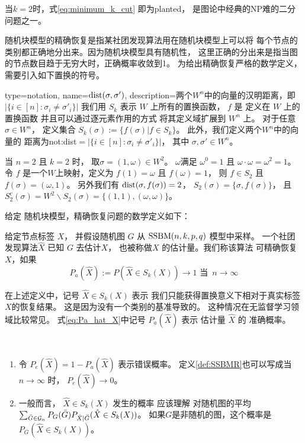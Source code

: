 当$k=2$时，式\eqref{eq:minimum_k_cut} 即为\gls{planted}，
是图论中经典的NP难的二分问题之一。


随机块模型的精确恢复是指某社团发现算法用在随机块模型上可以将
每个节点的类别都正确地分出来。因为随机块模型具有随机性，
这里正确的分出来是指当图的节点数目趋于无穷大时，正确概率收敛到1。
为给出精确恢复严格的数学定义，需要引入如下置换的符号。

{
  type=notation,
  name={$\operatorname{dist}(\sigma, \sigma')$},
  description={两个$W^n$中的向量的汉明距离，即$|\{i\in[n]:\sigma_i\neq \sigma'_i\}|$}
}
我们用 $S_k$ 表示 $W$  上所有的置换函数， 
$f$ 是 定义在 $W$ 上的置换函数
并且可以通过逐元素作用的方式
将其定义域扩展到 $W^n$ 上。
对于任意 $\sigma \in W^n$，
定义集合 $S_k(\sigma):=\{f(\sigma)| f\in S_k\}$。
此外，我们定义两个$W^n$中的向量的
距离为\gls{not:dist}$=|\{i\in[n]:\sigma_i\neq \sigma'_i\}|$，
其中 $\sigma,\sigma'\in W^n
$。
\begin{example}
当 $n=2$ 且 $k=2$ 时，
取$\sigma=(1, \omega) \in W^2$。
$\omega$满足
$\omega^0 = 1$ 且 $\omega \cdot \omega = \omega^2 = 1$。
令 $f$ 是一个$W$上映射，定义为
$f(1) = \omega$ 且 $f(\omega)=1$，
则 $f \in S_2$ 且 $f(\sigma) = (\omega, 1)$。
另外我们有 $\operatorname{dist}(\sigma, f(\sigma)) = 2$，
$S_2(\sigma) = \{\sigma, f(\sigma)\}$， 且
$S_2^c(\sigma) = W^2 \backslash S_2(\sigma)
=\{(1, 1), (\omega, \omega)\}$。
\end{example}

给定 随机块模型，精确恢复问题的数学定义如下：
\begin{definition} \label{def:SSBMR}
给定节点标签 $X$，
并假设随机图 $G$ 从 $\operatorname{SSBM}(n,k,p,q)$ 模型中采样。
一个社团发现算法$\hat{X}$ 已知 $G$ 去估计$X$，
也被称做$X$ 的估计量。我们称该算法
可精确恢复$X$，如果
\begin{equation}\label{eq:Pa_hat_X}
P_a(\hat{X}):=P(\hat{X} \in S_k(X)) \to 1 \textrm{ 当 }\, n \to \infty
\end{equation}
\end{definition}

在上述定义中，记号 $\hat{X} \in S_k(X)$ 表示
我们只能获得置换意义下相对于真实标签$X$的恢复结果。
这是因为没有一个类别的基准导致的。
这种情况在无监督学习领域比较常见。
式\eqref{eq:Pa_hat_X}中记号 $P_a(\hat{X})$
表示 估计量 $\hat{X}$ 的
准确概率。
\begin{remark}\label{rem:metric_exact_recovery}\,
  \begin{enumerate}
    \item 令 $P_e(\hat{X}) = 1 - P_a(\hat{X})$
    表示错误概率。
    定义\ref{def:SSBMR}也可以写成当$n\to \infty$
    时，
    $P_e(\hat{X}) \to 0$。
  \item  %
  一般而言， $\hat{X} \in S_k(X)$ 发生的概率 应该理解
  对随机图的平均 $\sum_{\bar{G} \in \mathcal{G}_n} P_G(\bar{G}) P_{\hat{X}|\bar{G}}(\hat{X} \in S_k(X))$。 
  如果$G$是非随机的图，这个概率是 $P_G(\hat{X} \in S_k(X))$。  
  \end{enumerate}
\end{remark}

